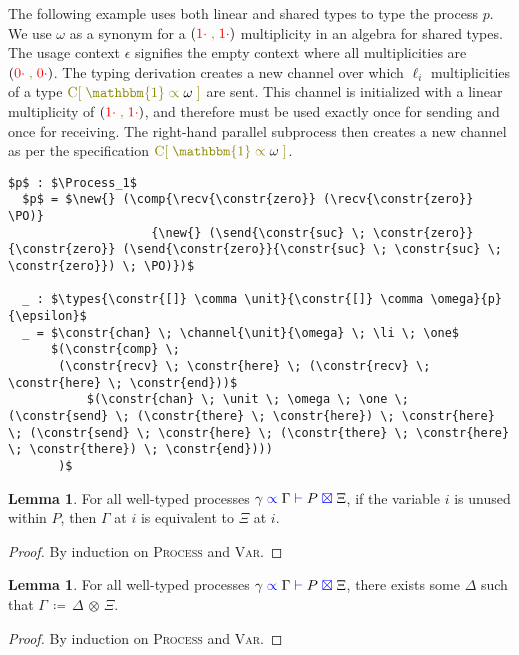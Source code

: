 \documentclass[a4paper,UKenglish,cleveref, autoref, thm-restate,authorcolumns]{lipics-v2019}
\theoremstyle{definition}
\newtheorem{nilemma}[theorem]{Lemma}
\newcommand{\type}[1]{\textcolor{blue}{\operatorname{#1}}}
\newcommand{\constr}[1]{\textcolor{olive}{\operatorname{#1}}}
\newcommand{\field}[1]{\textcolor{red}{\operatorname{#1}}}
\newcommand{\PO}{\constr{\mathbf{0}}}
\newcommand{\comp}[2]{#1 \; \constr{\parallel} \; #2}
\newcommand{\new}{\constr{\boldsymbol{\nu}} \;}
\newcommand{\send}[2]{#1 \; \constr{\langle} \; #2 \;\constr{\rangle} \;}\newcommand{\sendp}[2]{#1 \constr{\langle} #2 \constr{\rangle}}
\newcommand{\recv}[1]{#1 \; \constr{\mathbb{()}} \;}
\newcommand{\unit}{\constr{\mathbbm{1}}}
\newcommand{\channel}[2]{\constr{C[} \; #1 \; \constr{\propto} \; #2 \; \constr{]}}
\newcommand{\comma}{\; \constr{,} \;}
\newcommand{\opctx}[3]{#1 \, \coloneqq \, #2 \, \otimes \, #3}
\newcommand{\zero}{\field{0\cdot}}
\newcommand{\one}{\field{1\cdot}}
\newcommand{\li}{\ell_i}
\newcommand{\types}[4]{#1 \; \type{\propto} \; #2 \; \type{\vdash} \; #3 \; \type{\boxtimes} \; #4}
\newcommand{\Process}{\type{PROCESS}}
\begin{document}
\begin{example}
  \label{example-derivations}
  The following example uses both linear and shared types to type the process $p$. 
  We use $\omega$ as a synonym for a $(\one \comma \one)$ multiplicity in an algebra for shared types.
  The usage context $\epsilon$ signifies the empty context where all multiplicities are $(\zero \comma \zero)$.
  The typing derivation creates a new channel over which $\li$ multiplicities of a type $\channel{\unit}{\omega}$ are sent.
  This channel is initialized with a linear multiplicity of $(\one \comma \one)$, and therefore must be used exactly once for sending and once for receiving.
  The right-hand parallel subprocess then creates a new channel as per the specification $\channel{\unit}{\omega}$.
  
  \begin{lstlisting}[mathescape]
  $p$ : $\Process_1$
  $p$ = $\new{} (\comp{\recv{\constr{zero}} (\recv{\constr{zero}} \PO)}
                    {\new{} (\send{\constr{suc} \; \constr{zero}} {\constr{zero}} (\send{\constr{zero}}{\constr{suc} \; \constr{suc} \; \constr{zero}}) \; \PO)})$

  _ : $\types{\constr{[]} \comma \unit}{\constr{[]} \comma \omega}{p}{\epsilon}$
  _ = $\constr{chan} \; \channel{\unit}{\omega} \; \li \; \one$
      $(\constr{comp} \;
       (\constr{recv} \; \constr{here} \; (\constr{recv} \; \constr{here} \; \constr{end}))$
           $(\constr{chan} \; \unit \; \omega \; \one \; (\constr{send} \; (\constr{there} \; \constr{here}) \; \constr{here} \; (\constr{send} \; \constr{here} \; (\constr{there} \; \constr{here} \; \constr{there}) \; \constr{end})))
       )$
  \end{lstlisting}
\end{example}

\begin{nilemma}
  \label{lm:types-unused}
  For all well-typed processes $\types{\gamma}{\Gamma}{P}{\Xi}$, if the variable $i$ is unused within $P$, then $\Gamma$ at $i$ is equivalent to $\Xi$ at $i$.
\end{nilemma}
\begin{proof}
  By induction on \textsc{Process} and \textsc{Var}.
\end{proof}

\begin{nilemma}
  \label{lm:types-op}
  For all well-typed processes $\types{\gamma}{\Gamma}{P}{\Xi}$, there exists some $\Delta$ such that $\opctx{\Gamma}{\Delta}{\Xi}$.
\end{nilemma}
\begin{proof}
  By induction on \textsc{Process} and \textsc{Var}.
\end{proof}
\end{document}
